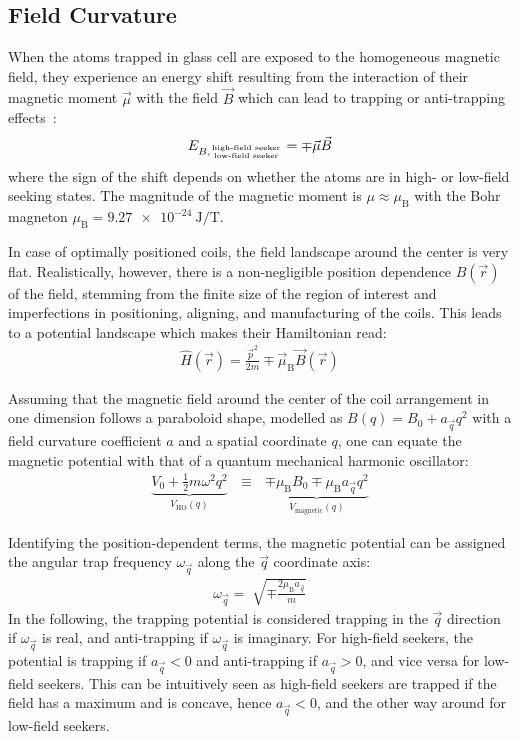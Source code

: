\subsection*{Field Curvature}\label{ch:field_curvature_definition}
When the atoms trapped in glass cell are exposed to the homogeneous magnetic field, they experience an energy shift resulting from the interaction of their magnetic moment $\vec \mu$ with the field $\vec B$ which can lead to trapping or anti-trapping effects~\cite{pritchard_cooling_1983,gehm_properties_2003, hagemann_setup_2020}:
\begin{align}
    E_{B, {\text{high-field seeker} \atop \text{low-field seeker}}} = \mp \vec \mu \vec B
\end{align}
where the sign of the shift depends on whether the atoms are in high- or low-field seeking states. The magnitude of the magnetic moment is $\mu \approx \mu_\text{B}$ with the Bohr magneton $\mu_\text{B} = \SI{9.27e-24}{\joule\per\tesla}$.

In case of optimally positioned coils, the field landscape around the center is very flat. Realistically, however, there is a non-negligible position dependence $B(\vec r)$ of the field, stemming from the finite size of the region of interest and imperfections in positioning, aligning, and manufacturing of the coils. This leads to a potential landscape which makes their Hamiltonian read:
\begin{align}
    \hat H(\vec r) = \frac{\vec p^2}{2m} \mp \vec \mu_\text{B} \vec B(\vec r)
\end{align}

Assuming that the magnetic field around the center of the coil arrangement in one dimension follows a paraboloid shape, modelled as $B(q) = B_0 + a_{\vec q} q^2$ with a field curvature coefficient $a$ and a spatial coordinate $q$, one can equate the magnetic potential with that of a quantum mechanical harmonic oscillator:
\begin{align}
    \underbrace{V_0 + \frac{1}{2}m\omega^2q^2}_{V_\text{HO}(q)} ~~~\equiv~~~ \underbrace{\mp \mu_\text{B} B_0 \mp \mu_\text{B} a_{\vec q} q^2}_{V_\text{magnetic}(q)}
\end{align}

Identifying the position-dependent terms, the magnetic potential can be assigned the angular trap frequency $\omega_{\vec q}$ along the $\vec q$ coordinate axis:
\begin{align}\label{eq:trap_omega_definition}
    \omega_{\vec q} = \sqrt[]{\mp\frac{2 \mu_\text{B} a_{\vec q}}{m}}
\end{align}
In the following, the trapping potential is considered trapping in the ${\vec q}$ direction if $\omega_{\vec q}$ is real, and anti-trapping if $\omega_{\vec q}$ is imaginary. For high-field seekers, the potential is trapping if $a_{\vec q} < 0$ and anti-trapping if $a_{\vec q} > 0$, and vice versa for low-field seekers. This can be intuitively seen as high-field seekers are trapped if the field has a maximum and is concave, hence $a_{\vec q} < 0$, and the other way around for low-field seekers.

